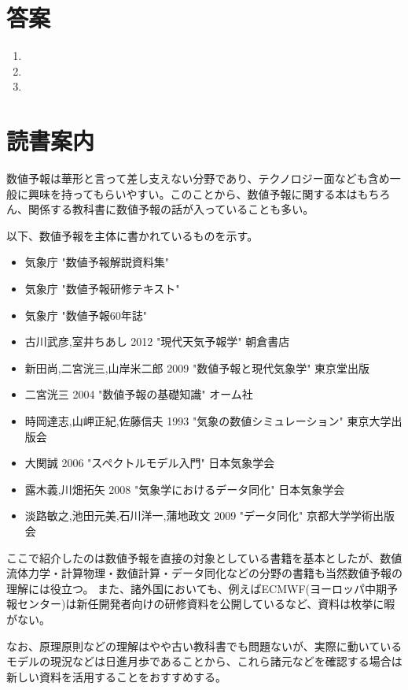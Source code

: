 \documentclass{jsarticle}
\newenvironment{problems}
{
  \renewcommand\labelenumi{\doublebox{\arabic{enumi}}}
  \begin{enumerate}
}{
  \end{enumerate}
  \renewcommand\labelenumi{\arabic{enumi}.}
}
\begin{document}
\section{答案}
\begin{problems}
\item 

\item 

\item 

\end{problems}

\section{読書案内}
数値予報は華形と言って差し支えない分野であり、テクノロジー面なども含め一般に興味を持ってもらいやすい。このことから、数値予報に関する本はもちろん、関係する教科書に数値予報の話が入っていることも多い。

以下、数値予報を主体に書かれているものを示す。
\begin{itemize}
\item 気象庁 "数値予報解説資料集"
\item 気象庁 "数値予報研修テキスト"
\item 気象庁 "数値予報60年誌"
\item 古川武彦,室井ちあし 2012 "現代天気予報学" 朝倉書店
\item 新田尚,二宮洸三,山岸米二郎 2009 "数値予報と現代気象学" 東京堂出版
\item 二宮洸三 2004 "数値予報の基礎知識" オーム社
\item 時岡達志,山岬正紀,佐藤信夫 1993 "気象の数値シミュレーション" 東京大学出版会
\item 大関誠 2006 "スペクトルモデル入門" 日本気象学会
\item 露木義,川畑拓矢 2008 "気象学におけるデータ同化" 日本気象学会
\item 淡路敏之,池田元美,石川洋一,蒲地政文 2009 "データ同化" 京都大学学術出版会
\end{itemize}

ここで紹介したのは数値予報を直接の対象としている書籍を基本としたが、数値流体力学・計算物理・数値計算・データ同化などの分野の書籍も当然数値予報の理解には役立つ。
また、諸外国においても、例えばECMWF(ヨーロッパ中期予報センター)は新任開発者向けの研修資料を公開しているなど、資料は枚挙に暇がない。

なお、原理原則などの理解はやや古い教科書でも問題ないが、実際に動いているモデルの現況などは日進月歩であることから、これら諸元などを確認する場合は新しい資料を活用することをおすすめする。
\end{document}
